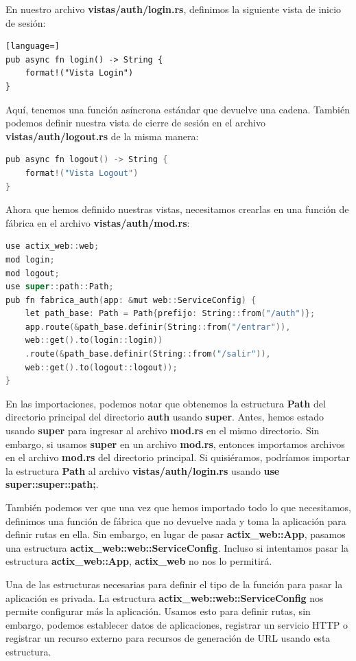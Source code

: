 En nuestro archivo \textbf{vistas/auth/login.rs}, definimos la siguiente vista de inicio de sesión:

\begin{lstlisting}[language=]
pub async fn login() -> String {
	format!("Vista Login")
}
\end{lstlisting}

Aquí, tenemos una función asíncrona estándar que devuelve una cadena. También podemos definir nuestra vista de cierre de sesión en el archivo \textbf{vistas/auth/logout.rs} de la misma manera:

\begin{lstlisting}[language=C]
pub async fn logout() -> String {
	format!("Vista Logout")
}
\end{lstlisting}

Ahora que hemos definido nuestras vistas, necesitamos crearlas en una función de fábrica en el archivo \textbf{vistas/auth/mod.rs}:

\begin{lstlisting}[language=C]
use actix_web::web;
mod login;
mod logout;
use super::path::Path;
pub fn fabrica_auth(app: &mut web::ServiceConfig) {
	let path_base: Path = Path{prefijo: String::from("/auth")};
	app.route(&path_base.definir(String::from("/entrar")), 
	web::get().to(login::login))
	.route(&path_base.definir(String::from("/salir")), 
	web::get().to(logout::logout));
}
\end{lstlisting}

En las importaciones, podemos notar que obtenemos la estructura \textbf{Path} del directorio principal del directorio \textbf{auth} usando \textbf{super}. Antes, hemos estado usando \textbf{super} para ingresar al archivo \textbf{mod.rs} en el mismo directorio. Sin embargo, si usamos \textbf{super} en un archivo \textbf{mod.rs}, entonces importamos archivos en el archivo \textbf{mod.rs }del directorio principal. Si quisiéramos, podríamos importar la estructura \textbf{Path} al archivo \textbf{vistas/auth/login.rs} usando \textbf{use super::super::path;}.

También podemos ver que una vez que hemos importado todo lo que necesitamos, definimos una función de fábrica que no devuelve nada y toma la aplicación para definir rutas en ella. Sin embargo, en lugar de pasar \textbf{actix\_web::App}, pasamos una estructura \textbf{actix\_web::web::ServiceConfig}. Incluso si intentamos pasar la estructura \textbf{actix\_web::App}, \textbf{actix\_web} no nos lo permitirá.

Una de las estructuras necesarias para definir el tipo de la función para pasar la aplicación es privada. La estructura \textbf{actix\_web::web::ServiceConfig} nos permite configurar más la aplicación. Usamos esto para definir rutas, sin embargo, podemos establecer datos de aplicaciones, registrar un servicio HTTP o registrar un recurso externo para recursos de generación de URL usando esta estructura.

